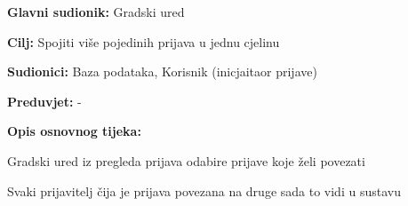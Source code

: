 					\noindent {}
					\begin{packed_item}
	
						\item \textbf{Glavni sudionik: }Gradski ured
						\item  \textbf{Cilj:} Spojiti više pojedinih prijava u jednu cjelinu
						\item  \textbf{Sudionici:} Baza podataka, Korisnik (inicjaitaor prijave)
						\item  \textbf{Preduvjet:} -
						\item  \textbf{Opis osnovnog tijeka:}
						
						\item[] \begin{packed_enum}
	
							\item Gradski ured iz pregleda prijava odabire prijave koje želi povezati
							\item Svaki prijavitelj čija je prijava povezana na druge sada to vidi u sustavu
						\end{packed_enum}
						
					\end{packed_item}
					
					\pagebreak
					
